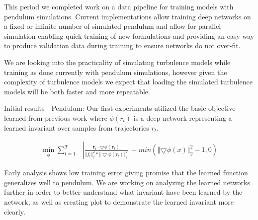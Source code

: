 \documentclass[10pt,letterpaper]{report}
\author{Brandon Houghton}
\begin{document}
This period we completed work on a data pipeline for training models with pendulum simulations. Current implementations allow training deep networks on a fixed or infinite number of simulated pendulum and allow for parallel simulation enabling quick training of new formulations and providing an easy way to produce validation data during training to ensure networks do not over-fit.

We are looking into the practicality of simulating turbulence models while training as done currently with pendulum simulations, however given the complexity of turbulence models we expect that loading the simulated turbulence models will be both faster and more repeatable. 

Initial results - Pendulum: Our first experiments utilized the basic objective learned from previous work  where $ \phi(r_t) $ is a deep network representing a learned invariant over samples from trajectories $r_t$. 

\begin{align}
\min_{\phi} \sum^{T}_{t = 1} &  
\left\vert
\frac{\dot{\pmb{r}_t} \cdot \bigtriangledown \phi \left( \pmb{r}_t \right)}{{\Vert f_t \Vert}^2_2 * {\Vert \bigtriangledown \phi (\pmb{r}_t) \Vert}^2_2}
\right\vert
-
min(\left\Vert \bigtriangledown \phi ( x ) \right\Vert^2_2 - 1 , 0)
\end{align}

Early analysis shows low training error giving promise that the learned function generalizes well to pendulum. We are working on analyzing the learned networks further in order to better understand what invariant have been learned by the network, as well as creating plot to demonstrate the learned invariant more clearly.
\end{document}

